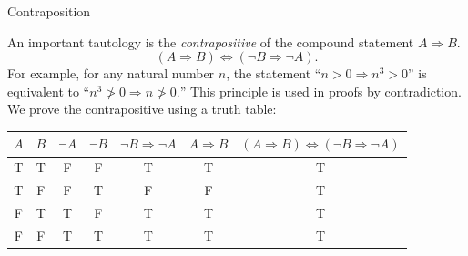 \documentclass[smaller,hyperref={CJKbookmarks=true}]{beamer}
\begin{document}
\begin{frame}[c]{Contraposition}
\begin{spacing}{1.1}
An important tautology is the \emph{contrapositive} of the compound statement $A\Rightarrow B$.
\[(A\Rightarrow B)\Leftrightarrow(\neg B\Rightarrow\neg A).\]
For example, for any natural number $n$, the statement ``$n>0\Rightarrow n^3>0$'' is equivalent to ``$n^3\ngtr0\Rightarrow n\ngtr0.$'' This principle is used in proofs by contradiction.\\
We prove the contrapositive using a truth table:
\begin{center}
\begin{tabular}{c|c|||c|c||c||c|||c}
  $A$ & $B$ & $\neg A$ & $\neg B$ & $\neg B\Rightarrow\neg A$ & $A\Rightarrow B$ & $(A\Rightarrow B)\Leftrightarrow(\neg B\Rightarrow\neg A)$ \\ \hline
  T & T & F & F & T & T & T \\
  T & F & F & T & F & F & T \\
  F & T & T & F & T & T & T \\
  F & F & T & T & T & T & T \\
\end{tabular}
\end{center}
\end{spacing}
\end{frame}
\end{document}
